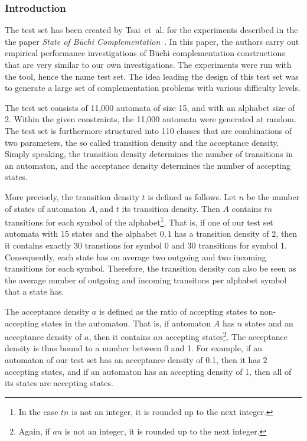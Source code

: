 \subsubsection{Introduction}
The \goal{} test set has been created by Tsai~et~al. for the experiments described in the the paper \textit{State of Büchi Complementation}~\cite{2010_tsai}. In this paper, the authors carry out empirical performance investigations of Büchi complementation constructions that are very similar to our own investigations. The experiments were run with the \goal{} tool, hence the name \goal{} test set. The idea leading the design of this test set was to generate a large set of complementation problems with various difficulty levels.

The test set consists of 11,000 automata of size 15, and with an alphabet size of 2. Within the given constraints, the 11,000 automata were generated at random. The test set is furthermore structured into 110 classes that are combinations of two parameters, the so called transition density and the acceptance density. Simply speaking, the transition density determines the number of transitions in an automaton, and the acceptance density determines the number of accepting states.

More precisely, the transition density $t$ is defined as follows. Let $n$ be the number of states of automaton $A$, and $t$ its transition density. Then $A$ contains $tn$ transitions for each symbol of the alphabet\footnote{In the case $tn$ is not an integer, it is rounded up to the next integer.}. That is, if one of our test set automata with 15 states and the alphabet ${0, 1}$ has a transition density of 2, then it contains exactly 30 transtions for symbol $0$ and 30 transitions for symbol $1$. Consequently, each state has on average two outgoing and two incoming transitions for each symbol. Therefore, the transition density can also be seen as the average number of outgoing and incoming transitons per alphabet symbol that a state has.

The acceptance density $a$ is defined as the ratio of accepting states to non-accepting states in the automaton. That is, if automaton $A$ has $n$ states and an acceptance density of $a$, then it contains $an$ accepting states\footnote{Again, if $an$ is not an integer, it is rounded up to the next integer.}. The acceptance density is thus bound to a number between 0 and 1. For example, if an automaton of our test set has an acceptance density of 0.1, then it has 2 accepting states, and if an automaton has an accepting density of 1, then all of its states are accepting states.

